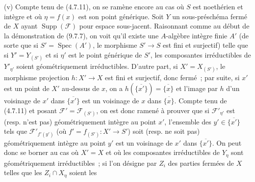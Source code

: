 (v) Compte tenu de (4.7.11), on se ramène encore au cas où $S$ est noethérien
et intègre et où $\eta=f(x)$ est son point générique. Soit $Y$ un
sous-préschéma fermé de $X$ ayant $\operatorname{Supp}(\mathcal F)$ pour espace
sous-jacent. Raisonnant comme au début de la démonstration de (9.7.7), on voit
qu'il existe une $A$-algèbre intègre finie $A'$ (de sorte que si
$S'=\operatorname{Spec}(A')$, le morphisme $S'\to S$ est fini et surjectif)
telle que si $Y'=Y_{(S')}$ et si $\eta'$ est le point générique de $S'$, les
composantes irréductibles de $Y'_{\eta'}$ soient géométriquement irréductibles.
D'autre part, si $X'=X_{(S')}$, le morphisme projection $h:X'\to X$ est fini
et surjectif, donc fermé~; par suite, si $x'$ est un point de $X'$ au-dessus de
$x$, on a $h(\overline{\{x'\}})=\overline{\{x\}}$ et l'image par $h$ d'un
voisinage de $x'$ dans $\overline{\{x'\}}$ est un voisinage de $x$ dans
$\overline{\{x\}}$. Compte tenu de (4.7.11) et posant
$\mathcal F'=\mathcal F_{(S')}$, on est donc ramené à prouver que si
$\mathcal F'_{\eta'}$ est (resp. n'est pas) géométriquement intègre au point
$x'$, l'ensemble des $y'\in\overline{\{x'\}}$ tels que
$\mathcal F'_{f'(y')}$ (où $f'=f_{(S')}:X'\to S'$) soit (resp. ne soit pas)
géométriquement intègre au point $y'$ est un voisinage de $x'$ dans
$\overline{\{x'\}}$. On peut donc se borner au cas où $X'=X$ et où les
composantes irréductibles de $Y_\eta$ sont géométriquement irréductibles~; si
l'on désigne par $Z_i$ des parties fermées de $X$ telles que les
$Z_i\cap X_\eta$ soient les

